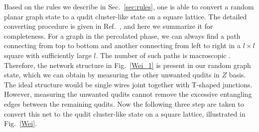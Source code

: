 \documentclass[aps,amsfonts,pra,twocolumn,showpacs]{revtex4-1}
\begin{document}
Based on the rules we describe in Sec.~\ref{sec:rules}, one is able to convert a random planar graph state to a qudit cluster-like state on a square lattice. The detailed converting procedure is given in Ref.~\cite{Wei2012}, and here we summarize it for completeness. For a graph in the percolated phase, we can always find a path connecting from top to bottom and another connecting from left to right in a $l \times l$ square with sufficiently large $l$. The number of such paths is macroscopic \cite{Browne2008}. Therefore, the network structure in Fig.~\ref{Wei_1} is present in our random graph state, which we can obtain by measuring the other unwanted qudits in $Z$ basis. The ideal structure would be single wires joint together with T-shaped junctions. However, measuring the unwanted qudits cannot remove the excessive entangling edges between the remaining qudits. Now the following three step are taken to convert this net to the qudit cluster-like state on a square lattice, illustrated in Fig.~\ref{Wei}.
\end{document}
